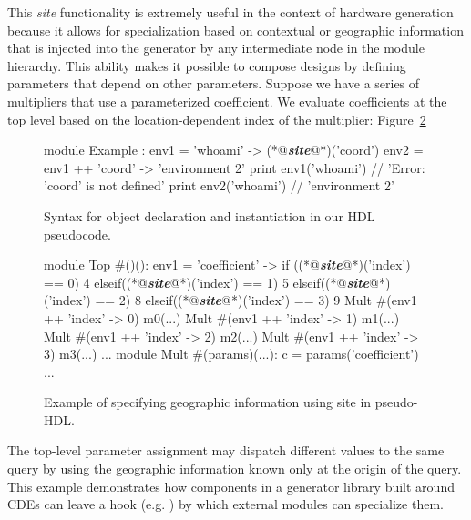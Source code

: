 This \emph{site} functionality is extremely useful in the context of hardware generation because it allows for specialization based on contextual or geographic information that is injected into the generator by any intermediate node in the module hierarchy.
This ability makes it possible to compose designs by defining parameters that depend on other parameters. Suppose we have a series of multipliers that use a parameterized coefficient. We evaluate coefficients at the top level based on the location-dependent index of the multiplier:
Figure~\ref{fig:site-phdl}

\begin{figure}
\centering
\begin{phdl}
module Example :
  env1 = {'whoami' -> (*@\textcolor[rgb]{1,0.5,0}{\textbf{\textit{site}}}@*)('coord')}
  env2 = env1 ++ {'coord' -> 'environment 2'}
  print env1('whoami')     // 'Error: 'coord' is not defined'
  print env2('whoami')     // 'environment 2'
\end{phdl}
\caption{Syntax for object declaration and instantiation in our HDL pseudocode.}
\label{fig:cde-phdl}
\end{figure}

\begin{figure}
\centering
\begin{phdl}
module Top #()():
  env1 = {'coefficient' -> if    ((*@\textcolor[rgb]{1,0.5,0}{\textbf{\textit{site}}}@*)('index') == 0) 4 
                           elseif((*@\textcolor[rgb]{1,0.5,0}{\textbf{\textit{site}}}@*)('index') == 1) 5
                           elseif((*@\textcolor[rgb]{1,0.5,0}{\textbf{\textit{site}}}@*)('index') == 2) 8
                           elseif((*@\textcolor[rgb]{1,0.5,0}{\textbf{\textit{site}}}@*)('index') == 3) 9}                        
  Mult #(env1 ++ {'index' -> 0}) m0(...)
  Mult #(env1 ++ {'index' -> 1}) m1(...)
  Mult #(env1 ++ {'index' -> 2}) m2(...)
  Mult #(env1 ++ {'index' -> 3}) m3(...) ...
module Mult #(params)(...):
  c = params('coefficient') ...
\end{phdl}
\caption{Example of specifying geographic information using site in pseudo-HDL.}
\label{fig:site-phdl}
\end{figure}

The top-level parameter assignment may dispatch different values to the same query by using the geographic information known only at the origin of the query. 
This example demonstrates how components in a generator library built around CDEs can leave a hook (e.g. ) by which external modules can specialize them.

